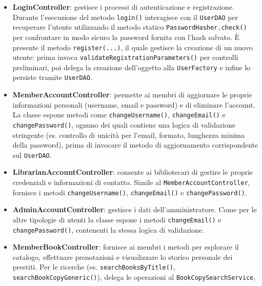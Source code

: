 \documentclass[
  italian,
  paper=a4,
  ,captions=tableheading
]{scrbook}
\newcommand{\passthrough}[1]{#1}
\begin{document}
\begin{itemize}
\item
  \textbf{LoginController}: gestisce i processi di autenticazione e
  registrazione. Durante l'esecuzione del metodo
  \passthrough{\lstinline!login()!} interagisce con il
  \passthrough{\lstinline!UserDAO!} per recuperare l'utente utilizzando
  il metodo statico \passthrough{\lstinline!PasswordHasher.check()!} per
  confrontare in modo sicuro la password fornita con l'hash salvato. È
  presente il metodo \passthrough{\lstinline!register(...)!}, il quale
  gestisce la creazione di un nuovo utente: prima invoca
  \passthrough{\lstinline!validateRegistrationParameters()!} per
  controlli preliminari, poi delega la creazione dell'oggetto alla
  \passthrough{\lstinline!UserFactory!} e infine lo persiste tramite
  \passthrough{\lstinline!UserDAO!}.
\item
  \textbf{MemberAccountController}: permette ai membri di aggiornare le
  proprie informazioni personali (username, email e password) e di
  eliminare l'account. La classe espone metodi come
  \passthrough{\lstinline!changeUsername()!},
  \passthrough{\lstinline!changeEmail()!} e
  \passthrough{\lstinline!changePassword()!}, ognuno dei quali contiene
  una logica di validazione stringente (es. controllo di unicità per
  l'email, formato, lunghezza minima della password), prima di invocare
  il metodo di aggiornamento corrispondente sul
  \passthrough{\lstinline!UserDAO!}.
\item
  \textbf{LibrarianAccountController}: consente ai bibliotecari di
  gestire le proprie credenziali e informazioni di contatto. Simile al
  \passthrough{\lstinline!MemberAccountController!}, fornisce i metodi
  \passthrough{\lstinline!changeUsername()!},
  \passthrough{\lstinline!changeEmail()!} e
  \passthrough{\lstinline!changePassword()!}.
\item
  \textbf{AdminAccountController}: gestisce i dati dell'amministratore.
  Come per le altre tipologie di utenti la classe espone i metodi
  \passthrough{\lstinline!changeEmail()!} e
  \passthrough{\lstinline!changePassword()!}, contenenti la stessa
  logica di validazione.
\item
  \textbf{MemberBookController}: fornisce ai membri i metodi per
  esplorare il catalogo, effettuare prenotazioni e visualizzare lo
  storico personale dei prestiti. Per le ricerche (es.
  \passthrough{\lstinline!searchBooksByTitle()!},
  \passthrough{\lstinline!searchBookCopyGeneric()!}), delega le
  operazioni al \passthrough{\lstinline!BookCopySearchService!},

\end{itemize}
\end{document}
